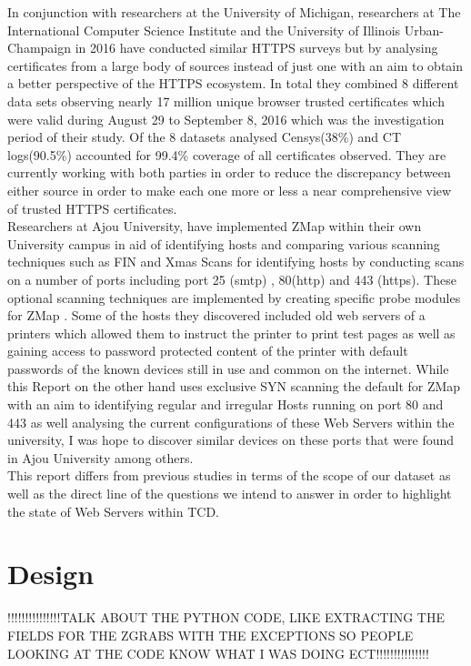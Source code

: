 \documentclass[a4wide,leqno,12pt]{report}
\begin{document}
In conjunction with researchers at the University of Michigan, researchers at The International Computer Science Institute and the University of Illinois Urban-Champaign in 2016 have conducted similar HTTPS surveys but by analysing certificates from a large body of sources instead of just one with an aim to obtain a better perspective of the HTTPS ecosystem. In total they combined 8 different data sets observing nearly 17 million unique browser trusted certificates which were valid during August 29 to September 8, 2016 which was the investigation period of their study. Of the 8 datasets analysed Censys(38\%) and CT logs(90.5\%) accounted for 99.4\% coverage of all certificates observed. They are currently working with both parties in order to reduce the discrepancy between either source in order to make each one more or less a near comprehensive view of trusted HTTPS certificates\cite{vandersloot2016towards}.\\

Researchers at Ajou University, have  implemented ZMap within their own University campus in aid of identifying hosts and comparing various scanning techniques such as FIN and Xmas Scans for identifying hosts by conducting scans on a number of ports including port 25 (smtp) , 80(http) and 443 (https). These optional scanning techniques are implemented by creating specific probe modules for ZMap \cite{lee2016implementation}. Some of the hosts they discovered included old web servers of a printers which allowed them to instruct the printer to print test pages as well as gaining access to  password protected content of the printer with default passwords of the known devices still in use and common on the internet. While this Report on the other hand uses exclusive SYN scanning the default for ZMap with an aim to identifying regular and irregular Hosts running on port 80 and 443 as well analysing the current configurations of these Web Servers within the university, I was hope to discover similar devices on these ports that were found in Ajou University among others.\\ 

This report differs from previous studies in terms of the scope of our dataset as well as the direct line of the questions we intend to answer in order to highlight the state of Web Servers within TCD.

\chapter{Design}
!!!!!!!!!!!!!!!TALK ABOUT THE PYTHON CODE, LIKE EXTRACTING THE FIELDS FOR THE ZGRABS WITH THE EXCEPTIONS SO PEOPLE LOOKING AT THE CODE KNOW WHAT I WAS DOING ECT!!!!!!!!!!!!!!!\\
\end{document}
